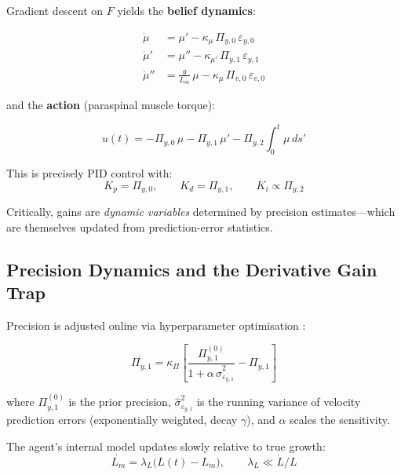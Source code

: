 \documentclass[12pt, letterpaper]{article}
\newcommand{\Kd}{K_d}
\newcommand{\Piy}{\Pi_{y,1}}
\newcommand{\epsy}{\varepsilon_{y,1}}
\newcommand{\Lm}{L_m}
\begin{document}
Gradient descent on $F$ yields the \textbf{belief dynamics}:

\begin{align}
  \dot{\mu}   &= \mu' - \kappa_\mu\,\Pi_{y,0}\,\varepsilon_{y,0} \label{eq:bdyn1}\\
  \dot{\mu}'  &= \mu'' - \kappa_{\mu'}\,\Piy\,\epsy            \label{eq:bdyn2}\\
  \dot{\mu}'' &= \frac{g}{\Lm}\,\mu - \kappa_\mu\,\Pi_{v,0}\,\varepsilon_{v,0}
  \label{eq:bdyn3}
\end{align}

and the \textbf{action} (paraspinal muscle torque):

\begin{equation}
  u(t) = -\Pi_{y,0}\,\mu - \Piy\,\mu' - \Pi_{y,2}\!\int_{0}^{t}\!\mu\,ds'
  \label{eq:action}
\end{equation}

This is precisely PID control \citep{Baltieri2019} with:
\begin{equation}
  \boxed{K_p = \Pi_{y,0}, \qquad \Kd = \Piy, \qquad K_i \propto \Pi_{y,2}}
  \label{eq:PIDmap}
\end{equation}

Critically, gains are \emph{dynamic variables} determined by precision
estimates---which are themselves updated from prediction-error statistics.

\subsection{Precision Dynamics and the Derivative Gain Trap}

Precision is adjusted online via hyperparameter optimisation
\citep{Mathys2011}:

\begin{equation}
  \dot{\Piy} = \kappa_\Pi
    \!\left[\frac{\Piy^{(0)}}{1 + \alpha\,\hat{\sigma}^{2}_{\epsy}} - \Piy\right]
  \label{eq:precdyn}
\end{equation}

where $\Piy^{(0)}$ is the prior precision, $\hat{\sigma}^{2}_{\epsy}$ is the
running variance of velocity prediction errors (exponentially weighted,
decay $\gamma$), and $\alpha$ scales the sensitivity.

The agent's internal model updates slowly relative to true growth:
\begin{equation}
  \dot{\Lm} = \lambda_L\bigl(L(t) - \Lm\bigr), \qquad \lambda_L \ll \dot{L}/L
  \label{eq:Lmodel}
\end{equation}
\end{document}
